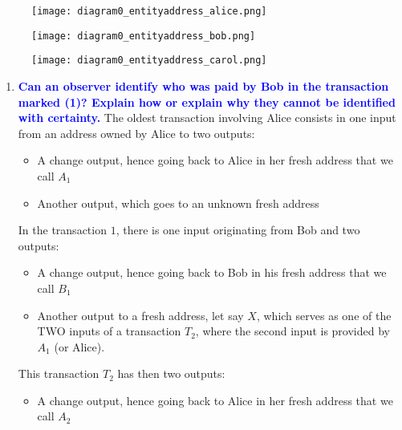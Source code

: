 \documentclass[11pt]{article}
\begin{document}
\begin{enumerate}
\begin{figure}[h!]
\centering
\begin{minipage}{.3\textwidth}
  \centering
  \texttt{[image: diagram0\_entityaddress\_alice.png]}
\end{minipage}
\hspace{6pt}
\begin{minipage}{.3\textwidth}
  \centering
  \texttt{[image: diagram0\_entityaddress\_bob.png]}
\end{minipage}
\hspace{6pt}
\begin{minipage}{.3\textwidth}
  \centering
  \texttt{[image: diagram0\_entityaddress\_carol.png]}
\end{minipage}
\end{figure}
    \begin{enumerate}
    \item \textbf{\textcolor{blue}{Can an observer identify who was paid by Bob in the transaction marked (1)? Explain how or explain why they cannot be identified with certainty.}}
        The oldest transaction involving Alice consists in one input from an address owned by Alice to two outputs:
        \begin{itemize}
            \item A change output, hence going back to Alice in her fresh address that we call $A_1$
            \item Another output, which goes to an unknown fresh address
        \end{itemize}
        In the transaction $1$, there is one input originating from Bob and two outputs:
        \begin{itemize}
            \item A change output, hence going back to Bob in his fresh address that we call $B_1$
            \item Another output to a fresh address, let say $X$, which serves as one of the TWO inputs of a transaction $T_2$, where the second input is provided by $A_1$ (or Alice).
        \end{itemize}
        This transaction $T_2$ has then two outputs:
        \begin{itemize}
            \item A change output, hence going back to Alice in her fresh address that we call $A_2$

\end{itemize}
\end{enumerate}
\end{enumerate}
\end{document}
